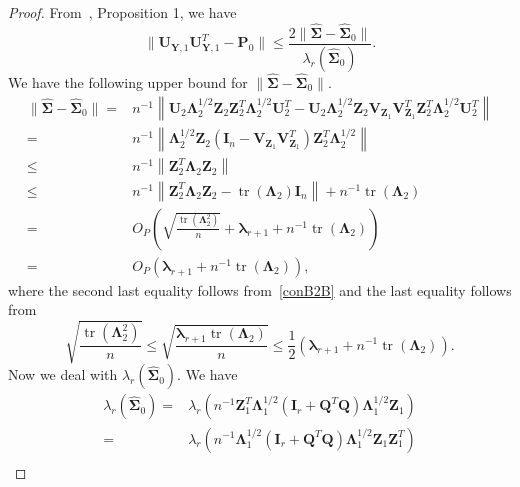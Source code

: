 \documentclass[12pt]{article} %
\DeclareMathOperator{\mytr}{tr}
\newcommand{\bQ}{\mathbf{Q}}
\newcommand{\bZ}{\mathbf{Z}}
\newcommand{\bP}{\mathbf{P}}
\newcommand{\bY}{\mathbf{Y}}
\newcommand{\bI}{\mathbf{I}}
\newcommand{\bU}{\mathbf{U}}
\newcommand{\bV}{\mathbf{V}}
\newcommand{\bfsym}[1]{\ensuremath{\boldsymbol{#1}}}
\def\blambda {\bfsym {\lambda}}
\def\bLambda {\bfsym {\Lambda}}
\def\bSigma {\bfsym {\Sigma}}
\theoremstyle{definition}
\begin{document}
\begin{appendices}
\begin{proof}
    From~\cite{Cai2015Optimal}, Proposition 1, we have
    \begin{equation}\label{asd1}
        \|\bU_{\bY,1}\bU_{\bY,1}^T -\bP_0 \|
        \leq 
        \frac{2\|\hat{\bSigma}-\hat{\bSigma}_0\|}{\lambda_r(\hat{\bSigma}_0)}.
    \end{equation}
    We have the following upper bound for $\|\hat{\bSigma}-\hat{\bSigma}_0\|$.
    \begin{equation}\label{asd2}
        \begin{split}
            \|\hat{\bSigma}-\hat{\bSigma}_0\|
            =&
    n^{-1}\left\|\bU_2 \bLambda_2^{1/2} \bZ_2  
    \bZ_2^T \bLambda_2^{1/2}\bU_2^T
    -\bU_2 \bLambda_2^{1/2} \bZ_2 
    \bV_{\bZ_1}
    \bV_{\bZ_1}^T
    \bZ_2^T \bLambda_2^{1/2}\bU_2^T
    \right\|
    \\
     =&
    n^{-1}\left\|
     \bLambda_2^{1/2} \bZ_2 
    (\bI_n-\bV_{\bZ_1}
    \bV_{\bZ_1}^T)
    \bZ_2^T \bLambda_2^{1/2}
    \right\|
    \\
    \leq &
    n^{-1}\left\|\bZ_2^T \bLambda_2 \bZ_2\right\|
    \\
 \leq& 
     n^{-1}\left\| \bZ_2^T \bLambda_2\bZ_2-\mytr(\bLambda_2)\bI_n\right\|
     +n^{-1}
     \mytr(\bLambda_2)
     \\
     =&O_P\left( 
\sqrt{\frac{\mytr\left(\bLambda_2^2\right)}{n}}+\blambda_{r+1}
     +
     n^{-1}\mytr(\bLambda_2)
 \right)
 \\
     =&O_P\left( 
\blambda_{r+1}
     +
     n^{-1}\mytr(\bLambda_2)
 \right)
 ,
    \end{split}
\end{equation}
where
the second last equality follows from~\eqref{conB2B} and the last equality follows from
\begin{equation*}
    \sqrt{\frac{\mytr\left(\bLambda_2^2\right)}{n}}
    \leq
    \sqrt{\frac{\blambda_{r+1}\mytr\left(\bLambda_2\right)}{n}}
    \leq
    \frac{1}{2}\left(\blambda_{r+1}+n^{-1}\mytr\left(\bLambda_2\right)\right).
\end{equation*}
Now we deal with $\lambda_r(\hat{\bSigma}_0)$.
We have
\begin{equation*}
    \begin{split}
     \lambda_r(\hat{\bSigma}_0)
     =&\lambda_r\left(
n^{-1}
         \bZ_1^T \bLambda_1^{1/2}(\bI_r +\bQ^T \bQ)\bLambda_1^{1/2} \bZ_1
     \right)
     \\
     =&\lambda_r\left(
n^{-1}
          \bLambda_1^{1/2}(\bI_r +\bQ^T \bQ)\bLambda_1^{1/2} \bZ_1\bZ_1^T
     \right)
     \\

\end{split}
\end{equation*}
\end{proof}
\end{appendices}
\end{document}
